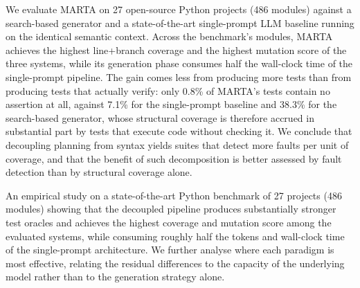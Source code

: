 

We evaluate MARTA on 27 open-source Python projects (486 modules) against a
search-based generator and a state-of-the-art single-prompt LLM baseline running on
the identical semantic context. Across the benchmark's modules, MARTA achieves the
highest line+branch coverage and the highest mutation score of the three systems,
while its generation phase consumes half the wall-clock time of the single-prompt
pipeline. The gain comes less from producing more tests than from producing tests that
actually verify:
only 0.8\% of MARTA's tests contain no assertion at all, against 7.1\% for the
single-prompt baseline and 38.3\% for the search-based generator, whose structural
coverage is therefore accrued in substantial part by tests that execute code without
checking it. We conclude that decoupling planning from syntax yields suites that
detect more faults per unit of coverage, and that the benefit of such decomposition is
better assessed by fault detection than by structural coverage alone.


\item An empirical study on a state-of-the-art Python benchmark of 27 projects
(486 modules) showing that the decoupled pipeline produces substantially stronger test
oracles and achieves the highest coverage and mutation score among the evaluated
systems, while consuming roughly half the tokens and wall-clock time of the
single-prompt architecture. We further analyse where each paradigm is most effective,
relating the residual differences to the capacity of the underlying model rather than
to the generation strategy alone.


